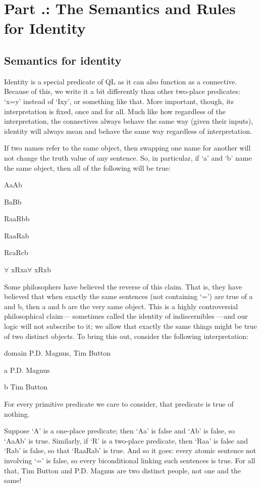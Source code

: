 \section{Part \thechapcount.\theseccount: The Semantics and Rules for Identity}
\subsection{Semantics for identity}

Identity is a special predicate of QL as it can also function as a connective. Because of this, we write it a bit differently than other two-place predicates: ‘x=y’ instead of ‘Ixy’, or something like that. More important, though, its interpretation is fixed, once and for all. Much like how regardless of the interpretation, the connectives always behave the same way (given their inputs), identity will always mean and behave the same way regardless of interpretation.

If two names refer to the same object, then swapping one name for another will not change the truth value of any sentence. So, in particular, if ‘a’ and ‘b’ name the same object, then all of the following will be true:
\begin{earg}
\item[]Aa\eiff Ab
\item[]Ba\eiff Bb
\item[]Raa\eiff Rbb
\item[]Raa\eiff Rab
\item[]Rca\eiff Rcb
\item[]$\forall$ xRxa\eiff $\forall$ xRxb
\end{earg}
Some philosophers have believed the reverse of this claim. That is, they have believed that when exactly the same sentences (not containing ‘=’) are true of a and b, then a and b are the very same object. This is a highly controversial philosophical claim— sometimes called the identity of indiscernibles —and our logic will not subscribe to it; we allow that exactly the same things might be true of two distinct objects. To bring this out, consider the following interpretation:
\begin{ekey}
\item[domain] P.D. Magnus, Tim Button
\item[a] P.D. Magnus
\item[b] Tim Button
\item[\textbullet] For every primitive predicate we care to consider, that predicate is true of nothing.
\end{ekey}
Suppose ‘A’ is a one-place predicate; then ‘Aa’ is false and ‘Ab’ is false, so ‘Aa\eiff Ab’ is true. Similarly, if ‘R’ is a two-place predicate, then ‘Raa’ is false and ‘Rab’ is false, so that ‘Raa\eiff Rab’ is true. And so it goes: every atomic sentence not involving ‘=’ is false, so every biconditional linking such sentences is true. For all that, Tim Button and P.D. Magnus are two distinct people, not one and the same!

